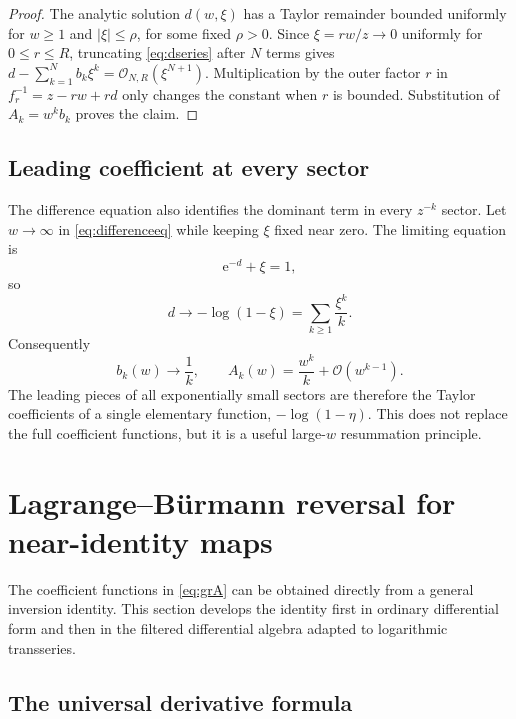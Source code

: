 \documentclass[11pt]{article}
\theoremstyle{clean}
\newcommand{\e}{\mathrm e}
\newcommand{\bigO}{\mathcal O}
\begin{document}
\begin{proof}
The analytic solution \(d(w,\xi)\) has a Taylor remainder bounded uniformly
for \(w\ge1\) and \(|\xi|\le\rho\), for some fixed \(\rho>0\).  Since
\(\xi=r w/z\to0\) uniformly for \(0\le r\le R\), truncating
\cref{eq:dseries} after \(N\) terms gives
\(d-\sum_{k=1}^N b_k\xi^k=\bigO_{N,R}(\xi^{N+1})\).  Multiplication by the
outer factor \(r\) in \(f_r^{-1}=z-rw+rd\) only changes the constant when
\(r\) is bounded.  Substitution of \(A_k=w^k b_k\) proves the claim.
\end{proof}

\subsection{Leading coefficient at every sector}

The difference equation also identifies the dominant term in every
\(z^{-k}\) sector.  Let \(w\to\infty\) in \cref{eq:differenceeq} while keeping
\(\xi\) fixed near zero.  The limiting equation is
\[
  \e^{-d}+\xi=1,
\]
so
\begin{equation}\label{eq:resummedleading}
  d\longrightarrow-\log(1-\xi)
  =\sum_{k\ge1}\frac{\xi^k}{k}.
\end{equation}
Consequently
\[
  b_k(w)\longrightarrow\frac1k,
  \qquad
  A_k(w)=\frac{w^k}{k}+\bigO(w^{k-1}).
\]
The leading pieces of all exponentially small sectors are therefore the
Taylor coefficients of a single elementary function, \(-\log(1-\eta)\).
This does not replace the full coefficient functions, but it is a useful
large-\(w\) resummation principle.

\section{Lagrange--B\"urmann reversal for near-identity maps}

The coefficient functions in \cref{eq:grA} can be obtained directly from a
general inversion identity.  This section develops the identity first in
ordinary differential form and then in the filtered differential algebra
adapted to logarithmic transseries.

\subsection{The universal derivative formula}
\end{document}
